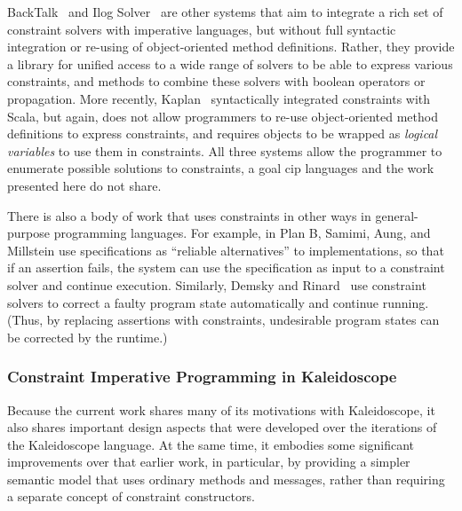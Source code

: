 BackTalk~\cite{roy1997reifying} and Ilog Solver~\cite{puget1994c++,ilogmanual}
are other systems that aim to integrate a rich set of constraint
solvers with imperative languages, but without full syntactic
integration or re-using of object-oriented method definitions. Rather,
they provide a library for unified access to a wide range of solvers
to be able to express various constraints, and methods to combine
these solvers with boolean operators or
propagation.  More recently, Kaplan~\cite{koksal2012constraints} 
syntactically integrated constraints with Scala, but again, does not
allow programmers to re-use object-oriented method definitions to
express constraints, and requires objects to be wrapped as
\emph{logical variables} to use them in constraints. All three systems
allow the programmer to enumerate possible solutions to constraints, a
goal \ac{cip} languages and the work presented here do not share.

There is also a body of work that uses constraints in other ways in
general-purpose programming languages.  For example, 
in Plan B, Samimi, Aung, and
Millstein \cite{samimi-ecoop-2010} use specifications as ``reliable
alternatives'' to implementations, so that if an assertion fails, the
system can use the specification as input to a constraint solver and
continue execution.  Similarly, Demsky and Rinard~\cite{demsky2006goal}
use constraint solvers to correct a faulty program state automatically
and continue running.  (Thus, by replacing assertions with
constraints, undesirable program states can be corrected by the
runtime.)

\subsubsection*{Constraint Imperative Programming in Kaleidoscope}
Because the current work shares many of its motivations with
Kaleidoscope, it also shares important design aspects that were
developed over the iterations of the Kaleidoscope language.  At the
same time, it embodies some significant improvements over that earlier
work, in particular, by providing a simpler semantic model that uses
ordinary methods and messages, rather than requiring a separate
concept of constraint constructors.

